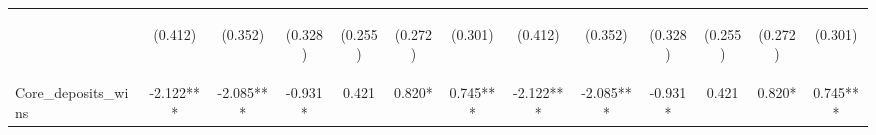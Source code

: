 \documentclass[]{article}
\begin{document}
\begin{center}
\begin{tabular}{lcccccccccccc}
\vspace{4pt} & \begin{footnotesize}(0.412)\end{footnotesize} & \begin{footnotesize}(0.352)\end{footnotesize} & \begin{footnotesize}(0.328)\end{footnotesize} & \begin{footnotesize}(0.255)\end{footnotesize} & \begin{footnotesize}(0.272)\end{footnotesize} & \begin{footnotesize}(0.301)\end{footnotesize} & \begin{footnotesize}(0.412)\end{footnotesize} & \begin{footnotesize}(0.352)\end{footnotesize} & \begin{footnotesize}(0.328)\end{footnotesize} & \begin{footnotesize}(0.255)\end{footnotesize} & \begin{footnotesize}(0.272)\end{footnotesize} & \begin{footnotesize}(0.301)\end{footnotesize} \\
Core\_deposits\_wins & -2.122*** & -2.085*** & -0.931* & 0.421 & 0.820* & 0.745*** & -2.122*** & -2.085*** & -0.931* & 0.421 & 0.820* & 0.745*** \\

\end{tabular}
\end{center}
\end{document}
